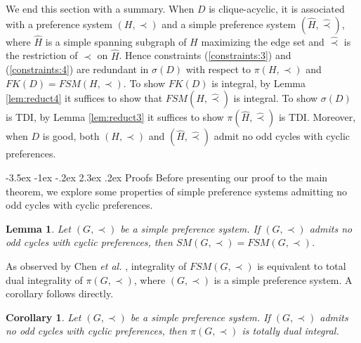 \documentclass[11pt]{article}
\makeatletter
\newtheorem{lemma}[theorem]{Lemma}
\newtheorem{corollary}[theorem]{Corollary}
\numberwithin{theorem}{section}
\renewcommand\section{%
  \@startsection{section}{1}
                {\z@}%
                {-3.5ex \@plus -1ex \@minus -.2ex}%
                {2.3ex \@plus.2ex}%
                {\large\bfseries}%
}
\makeatother
\begin{document}
We end this section with a summary. When $D$ is clique-acyclic, it is associated with a preference system $(H,\prec)$ and a simple preference system $(\hat{H},\hat\prec)$, where $\hat{H}$ is a simple spanning subgraph of $H$ maximizing the edge set and $\hat\prec$ is the restriction of $\prec$ on $\hat{H}$.
Hence constraints (\ref{constraints:3}) and (\ref{constraints:4}) are redundant in $\sigma(D)$ with respect to $\pi(H,\prec)$ and $FK(D)=FSM(H,\prec)$. To show $FK(D)$ is integral, by Lemma \ref{lem:reduct4} it suffices to show that $FSM(\hat{H},\hat\prec)$ is integral. To show $\sigma(D)$ is TDI, by Lemma \ref{lem:reduct3} it suffices to show $\pi(\hat{H},\hat\prec)$ is TDI. Moreover, when $D$ is good, both $(H,\prec)$ and $(\hat{H},\hat\prec)$ admit no odd cycles with cyclic preferences.

\section{Proofs}
Before presenting our proof to the main theorem, we explore some properties of simple preference systems admitting no odd cycles with cyclic preferences.
\begin{lemma}
\label{lem:prf1}
Let $(G,\prec)$ be a simple preference system. If $(G,\prec)$ admits no odd cycles with cyclic preferences, then $SM(G,\prec)=FSM(G,\prec)$.
\end{lemma}

As observed by Chen \textit{et al.} \cite{ChenDing12}, integrality of $FSM(G,\prec)$ is equivalent to total dual integrality of $\pi(G,\prec)$, where $(G,\prec)$ is a simple preference system. A corollary follows directly.

\begin{corollary}
\label{cor:prf2}
Let $(G,\prec)$ be a simple preference system. If $(G,\prec)$ admits no odd cycles with cyclic preferences, then $\pi(G,\prec)$ is totally dual integral.
\end{corollary}
\end{document}
